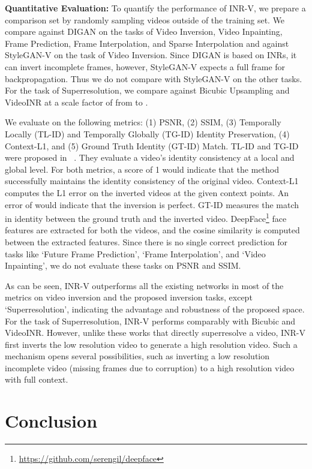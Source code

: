 \documentclass[10pt]{article} \usepackage[accepted]{tmlr}
\begin{document}
\textbf{Quantitative Evaluation: }
\label{sec:video-inversion-quant}
To quantify the performance of INR-V, we prepare a comparison set by randomly sampling  videos outside of the training set. 
We compare against DIGAN on the tasks of Video Inversion, Video Inpainting, Frame Prediction, Frame Interpolation, and Sparse Interpolation and against StyleGAN-V on the task of Video Inversion. Since DIGAN is based on INRs, it can invert incomplete frames, however, StyleGAN-V expects a full frame for backpropagation. Thus we do not compare with StyleGAN-V on the other tasks.
For the task of Superresolution, we compare against Bicubic Upsampling and VideoINR at a scale factor of  from  to .

We evaluate on the following metrics: (1) PSNR, (2) SSIM, (3) Temporally Locally (TL-ID) and Temporally Globally (TG-ID) Identity Preservation, (4) Context-L1, and (5) Ground Truth Identity (GT-ID) Match. TL-ID and TG-ID were proposed in ~\cite{stit}. They evaluate a video's identity consistency at a local and global level. For both metrics, a score of 1 would indicate that the method successfully maintains the identity consistency of the original video. Context-L1 computes the L1 error on the inverted videos at the given context points. An error of  would indicate that the inversion is perfect. GT-ID measures the match in identity between the ground truth and the inverted video. DeepFace\def\thefootnote{}\footnote{\href{https://github.com/serengil/deepface}{https://github.com/serengil/deepface}} face features are extracted for both the videos, and the cosine similarity is computed between the extracted features.
Since there is no single correct prediction for tasks like `Future Frame Prediction', `Frame Interpolation', and `Video Inpainting', we do not evaluate these tasks on PSNR and SSIM.

As can be seen, INR-V outperforms all the existing networks in most of the metrics on video inversion and the proposed inversion tasks, except `Superresolution', indicating the advantage and robustness of the proposed space. 
For the task of Superresolution, INR-V performs comparably with Bicubic and VideoINR. However, unlike these works that directly superresolve a video, INR-V first inverts the low resolution video to generate a high resolution video. 
Such a mechanism opens several possibilities, such as inverting a low resolution incomplete video (missing frames due to corruption) to a high resolution video with full context.

\section{Conclusion}
\label{conclusion_future_work}
\end{document}
